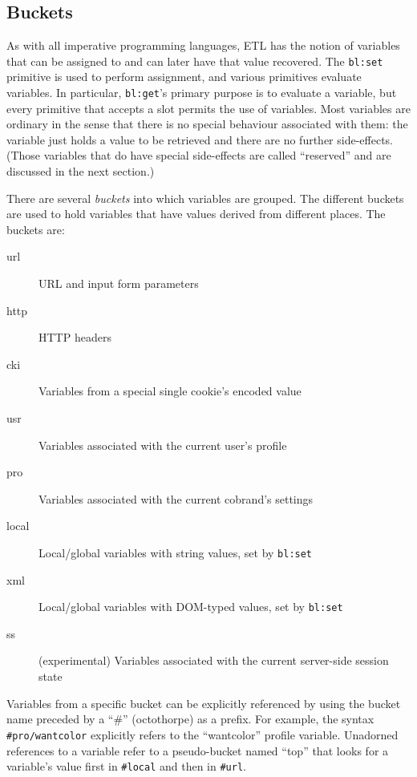 \documentclass{www2003-submission}
\newcommand{\smtexttt}[1]{{\small\texttt{#1}}}
\begin{document}
\subsection{Buckets}
\label{ssec-buckets}

As with all imperative programming languages, ETL has the notion of
variables that can be assigned to and can later have that value
recovered.  The \smtexttt{bl:set} primitive is used to perform
assignment, and various primitives evaluate variables. In particular,
\smtexttt{bl:get}'s primary purpose is to evaluate a variable, but
every primitive that accepts a slot permits the use of variables.  Most
variables are ordinary in the sense that there is no special behaviour
associated with them: the variable just holds a value to be retrieved and
there are no further side-effects.  (Those variables that do have special
side-effects are called ``reserved'' and are discussed in the next
section.)

There are several \emph{buckets} into which variables are grouped.  The
different buckets are used to hold variables that have values derived
from different places.  The buckets are:

\begin{description}
\item[url] URL and input form parameters
\item[http] HTTP headers
\item[cki] Variables from a special single cookie's encoded value
\item[usr] Variables associated with the current user's profile
\item[pro] Variables associated with the current cobrand's settings
\item[local] Local/global variables with string values, set by \smtexttt{bl:set}
\item[xml] Local/global variables with DOM-typed values, set by \smtexttt{bl:set}
\item[ss] (experimental) Variables associated with the current server-side session
      state
\end{description}

\noindent Variables from a specific bucket can be explicitly referenced
by using the bucket name preceded by a ``\#'' (octothorpe) as a prefix.
For example, the syntax \smtexttt{\#pro/wantcolor} explicitly refers to
the ``wantcolor'' profile variable. Unadorned references to a variable
refer to a pseudo-bucket named ``top'' that looks for a variable's
value first in \smtexttt{\#local} and then in \smtexttt{#url}.
\end{document}
